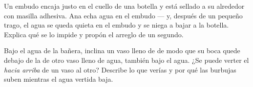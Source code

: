 \begin{exercise}[$\star\star$]\label{exo:g2:air-around-us:9}
Un embudo encaja justo en el cuello de una botella y está sellado a su
alrededor con masilla adhesiva. Ana echa agua en el embudo --- y,
después de un pequeño trago, el agua se queda quieta en el embudo y se
niega a bajar a la botella. Explica qué se lo impide y propón el
arreglo de un segundo.
\end{exercise}

\begin{exercise}[$\star\star$]\label{exo:g2:air-around-us:10}
Bajo el agua de la bañera, inclina un vaso lleno de  de modo que
su boca quede debajo de la de otro vaso lleno de agua, también bajo el
agua. ¿Se puede verter el  \emph{hacia arriba} de un vaso al
otro? Describe lo que verías y por qué las burbujas suben mientras el
agua vertida baja.
\end{exercise}
